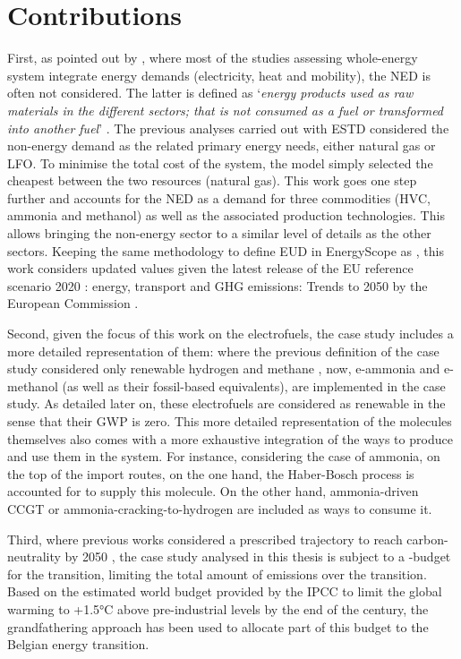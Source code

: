 \section*{Contributions}
\label{sec:cs:contributions}
First, as pointed out by \citet{rixhon2022integration}, where most of the studies assessing whole-energy system integrate energy demands (\ie electricity, heat and mobility), the \acrfull{NED} is often not considered. The latter is defined as ‘\textit{energy products used as raw materials in the different sectors; that is not consumed as a fuel or transformed into another fuel}’ \cite{Eurostat2019}. The previous analyses carried out with \gls{ESTD} considered the non-energy demand as the related primary energy needs, \ie either natural gas or \gls{LFO}. To minimise the total cost of the system, the model simply selected the cheapest between the two resources (\ie natural gas). This work goes one step further and accounts for the \gls{NED} as a demand for three commodities (\ie \gls{HVC}, ammonia and methanol) as well as the associated production technologies. This allows bringing the non-energy sector to a similar level of details as the other sectors.  Keeping the same methodology to define \gls{EUD} in EnergyScope as \citet{Limpens2020}, this work considers updated values given the latest release of the \og EU reference scenario 2020 : energy, transport and GHG emissions: Trends to 2050 \fg by the European Commission \cite{EuropeanCommission2021}.

Second, given the focus of this work on the electrofuels, the case study includes a more detailed representation of them: where the previous definition of the case study considered only renewable hydrogen and methane \cite{limpens2021generating}, now, e-ammonia and e-methanol (as well as their fossil-based equivalents), are implemented in the case study. As detailed later on, these electrofuels are considered as renewable in the sense that their \gls{GWP} is zero. This more detailed representation of the molecules themselves also comes with a more exhaustive integration of the ways to produce and use them in the system. For instance, considering the case of ammonia, on the top of the import routes, on the one hand, the Haber-Bosch process is accounted for to supply this molecule. On the other hand, ammonia-driven \gls{CCGT} or ammonia-cracking-to-hydrogen are included as ways to consume it.

Third, where previous works considered a prescribed  trajectory to reach carbon-neutrality by 2050 \cite{limpens2021generating, limpens2024pathway}, the case study analysed in this thesis is subject to a -budget for the transition, \ie limiting the total amount of emissions over the transition. Based on the estimated world budget provided by the \gls{IPCC} to limit the global warming to +1.5°C above pre-industrial levels by the end of the century, the grandfathering approach has been used to allocate part of this budget to the Belgian energy transition.

